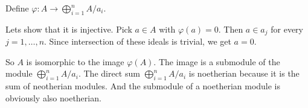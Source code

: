 \newcommand{\sheet}{5}




\maketitle

\begin{exercise}{1}

    Define $\varphi \colon A \rightarrow \bigoplus^n_{i=1} A / a_i$.

    Lets show that it is injective. Pick $a \in A$ with $\varphi(a) = 0$. Then
    $a \in a_j$ for every $j = 1, \ldots, n$. Since intersection of these ideals
    is trivial, we get $a = 0$.

    So $A$ is isomorphic to the image $\varphi(A)$. The image is a submodule of
    the module $\bigoplus^n_{i=1} A / a_i$. The direct sum $\bigoplus^n_{i=1} A
    / a_i$ is noetherian because it is the sum of neotherian modules. And the
    submodule of a noetherian module is obviously also noetherian.
\end{exercise}

\begin{exercise}{2}
\end{exercise}

